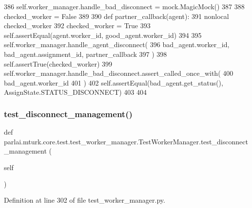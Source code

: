 \begin{DoxyCode}
386         self.worker\_manager.handle\_bad\_disconnect = mock.MagicMock()
387 
388         checked\_worker = \textcolor{keyword}{False}
389 
390         \textcolor{keyword}{def }partner\_callback(agent):
391             nonlocal checked\_worker
392             checked\_worker = \textcolor{keyword}{True}
393             self.assertEqual(agent.worker\_id, good\_agent.worker\_id)
394 
395         self.worker\_manager.handle\_agent\_disconnect(
396             bad\_agent.worker\_id, bad\_agent.assignment\_id, partner\_callback
397         )
398         self.assertTrue(checked\_worker)
399         self.worker\_manager.handle\_bad\_disconnect.assert\_called\_once\_with(
400             bad\_agent.worker\_id
401         )
402         self.assertEqual(bad\_agent.get\_status(), AssignState.STATUS\_DISCONNECT)
403 
404 
\end{DoxyCode}
\mbox{\label{classparlai_1_1mturk_1_1core_1_1test_1_1test__worker__manager_1_1TestWorkerManager_a30ccf181d4f9a97d2b7fb760209f7b85}} 
\subsubsection{\texorpdfstring{test\+\_\+disconnect\+\_\+management()}{test\_disconnect\_management()}}
{\footnotesize\ttfamily def parlai.\+mturk.\+core.\+test.\+test\+\_\+worker\+\_\+manager.\+Test\+Worker\+Manager.\+test\+\_\+disconnect\+\_\+management (\begin{DoxyParamCaption}\item[{}]{self }\end{DoxyParamCaption})}



Definition at line 302 of file test\+\_\+worker\+\_\+manager.\+py.


